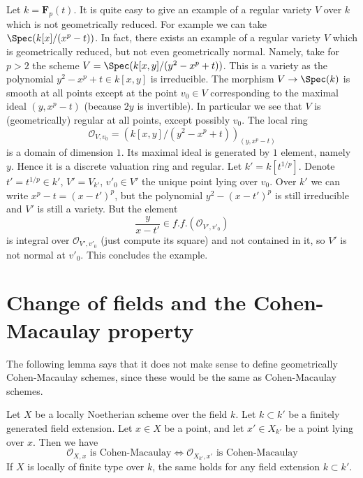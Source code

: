 \begin{example}
\label{example-geometrically-reduced-not-normal}
Let $k =\mathbf{F}_p(t)$. It is quite easy to give an example of a regular
variety $V$ over $k$ which is not geometrically reduced. For example we
can take $\Spec(k[x]/(x^p - t))$. In fact, there exists an
example of a regular variety $V$ which is geometrically reduced, but
not even geometrically normal. Namely, take for $p > 2$ the scheme
$V = \Spec(k[x, y]/(y^2 - x^p + t))$. This is a variety as the
polynomial $y^2 - x^p + t \in k[x, y]$ is irreducible.
The morphism $V \to \Spec(k)$ is smooth at all points
except at the point $v_0 \in V$ corresponding to the maximal ideal
$(y, x^p - t)$ (because $2y$ is invertible). In particular we see that
$V$ is (geometrically) regular at all points, except possibly $v_0$.
The local ring
$$
\mathcal{O}_{V, v_0} = \left(k[x, y]/(y^2 - x^p + t)\right)_{(y, x^p - t)}
$$
is a domain of dimension $1$. Its maximal ideal is generated by $1$ element,
namely $y$. Hence it is a discrete valuation ring and regular.
Let $k' = k[t^{1/p}]$. Denote $t' = t^{1/p} \in k'$,
$V' = V_{k'}$, $v'_0 \in V'$ the unique point lying over $v_0$.
Over $k'$ we can write $x^p - t = (x - t')^p$, but the polynomial
$y^2 - (x - t')^p$ is still irreducible and $V'$ is still a variety.
But the element
$$
\frac{y}{x - t'} \in f.f.(\mathcal{O}_{V', v'_0})
$$
is integral over $\mathcal{O}_{V', v'_0}$ (just compute its square)
and not contained in it, so $V'$ is not normal at $v'_0$. This concludes
the example.
\end{example}







\section{Change of fields and the Cohen-Macaulay property}
\label{section-CM}

\noindent
The following lemma says that it does not make sense to define
geometrically Cohen-Macaulay schemes, since these would be the
same as Cohen-Macaulay schemes.

\begin{lemma}
\label{lemma-CM-base-change}
Let $X$ be a locally Noetherian scheme over the field $k$.
Let $k \subset k'$ be a finitely generated field extension.
Let $x \in X$ be a point, and let $x' \in X_{k'}$ be a point lying
over $x$. Then we have
$$
\mathcal{O}_{X, x}\text{ is Cohen-Macaulay}
\Leftrightarrow
\mathcal{O}_{X_{k'}, x'}\text{ is Cohen-Macaulay}
$$
If $X$ is locally of finite type over $k$, the same holds for any
field extension $k \subset k'$.
\end{lemma}

